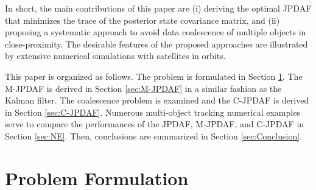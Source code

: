 In short, the main contributions of this paper are (i) deriving the optimal JPDAF that minimizes the trace of the posterior state covariance matrix, and (ii) proposing a systematic approach to avoid data coalescence of multiple objects in close-proximity. The desirable features of the proposed approaches are illustrated by extensive numerical simulations with satellites in orbits.

This paper is organized as follows.
The problem is formulated in Section \ref{sec:PF}.
The M-JPDAF is derived in Section \ref{sec:M-JPDAF} in a similar fashion as the Kalman filter.
The coalescence problem is examined and the C-JPDAF is derived in Section \ref{sec:C-JPDAF}.
Numerous multi-object tracking numerical examples serve to compare the performances of the JPDAF, M-JPDAF, and C-JPDAF in Section \ref{sec:NE}.
Then, conclusions are summarized in Section \ref{sec:Conclusion}.




\section{Problem Formulation}
\label{sec:PF}
%
%

%

